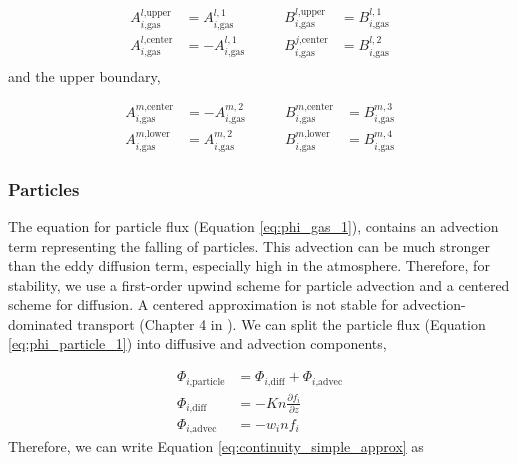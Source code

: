 \begin{equation*}
  \begin{aligned}
  A_{i\text{,gas}}^{l\text{,upper}} &= A_{i\text{,gas}}^{l,1} \\
  A_{i\text{,gas}}^{l\text{,center}} &= - A_{i\text{,gas}}^{l,1} \\
  \end{aligned}
  \quad\quad
  \begin{aligned}
  B_{i\text{,gas}}^{l\text{,upper}} &= B_{i\text{,gas}}^{l,1} \\
  B_{i\text{,gas}}^{j\text{,center}} &= B_{i\text{,gas}}^{l,2} \\
  \end{aligned}
\end{equation*}
and the upper boundary,

\begin{equation*}
  \begin{aligned}
  A_{i\text{,gas}}^{m\text{,center}} &= - A_{i\text{,gas}}^{m,2} \\
  A_{i\text{,gas}}^{m\text{,lower}} &= A_{i\text{,gas}}^{m,2}
  \end{aligned}
  \quad\quad
  \begin{aligned}
  B_{i\text{,gas}}^{m\text{,center}} &= B_{i\text{,gas}}^{m,3} \\
  B_{i\text{,gas}}^{m\text{,lower}} &= B_{i\text{,gas}}^{m,4}
  \end{aligned}
\end{equation*}

\subsubsection{Particles} \label{sec:FV_particles}

The equation for particle flux (Equation \eqref{eq:phi_gas_1}), contains an advection term representing the falling of particles. This advection can be much stronger than the eddy diffusion term, especially high in the atmosphere. Therefore, for stability, we use a first-order upwind scheme for particle advection and a centered scheme for diffusion. A centered approximation is not stable for advection-dominated transport (Chapter 4 in \cite{Leveque_2002}). We can split the particle flux (Equation \eqref{eq:phi_particle_1}) into diffusive and advection components,

\begin{align*}
  \Phi_{i\text{,particle}} &= \Phi_{i\text{,diff}} + \Phi_{i\text{,advec}} \\
  \Phi_{i\text{,diff}} &= - Kn\frac{\partial f_{i}}{\partial z} \\
  \Phi_{i\text{,advec}} &= - w_i n f_{i}
\end{align*}
Therefore, we can write Equation \eqref{eq:continuity_simple_approx} as

